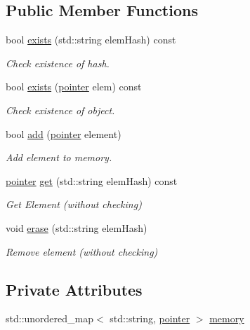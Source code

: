 \subsection*{Public Member Functions}
\begin{DoxyCompactItemize}
\item 
bool \mbox{\hyperlink{classHashMemory_ac9bd6270bbfa924ce5f27fada28afe9f}{exists}} (std\+::string elem\+Hash) const
\begin{DoxyCompactList}\small\item\em Check existence of hash. \end{DoxyCompactList}\item 
bool \mbox{\hyperlink{classHashMemory_aca03e1a9ea9ce94e34871a004cc6f7e4}{exists}} (\mbox{\hyperlink{classHashMemory_ab2c7ace63d7bbcf75d523c445a3a0dbb}{pointer}} elem) const
\begin{DoxyCompactList}\small\item\em Check existence of object. \end{DoxyCompactList}\item 
bool \mbox{\hyperlink{classHashMemory_aa1f2e179dc50cee47891064bbb82f2c9}{add}} (\mbox{\hyperlink{classHashMemory_ab2c7ace63d7bbcf75d523c445a3a0dbb}{pointer}} element)
\begin{DoxyCompactList}\small\item\em Add element to memory. \end{DoxyCompactList}\item 
\mbox{\hyperlink{classHashMemory_ab2c7ace63d7bbcf75d523c445a3a0dbb}{pointer}} \mbox{\hyperlink{classHashMemory_a51cf6dae3ddcf94f7bf13769f6677afd}{get}} (std\+::string elem\+Hash) const
\begin{DoxyCompactList}\small\item\em Get Element (without checking) \end{DoxyCompactList}\item 
void \mbox{\hyperlink{classHashMemory_a96bcc6b0bf9ae5999ca29bb61a3eff0c}{erase}} (std\+::string elem\+Hash)
\begin{DoxyCompactList}\small\item\em Remove element (without checking) \end{DoxyCompactList}\end{DoxyCompactItemize}
\subsection*{Private Attributes}
\begin{DoxyCompactItemize}
\item 
std\+::unordered\+\_\+map$<$ std\+::string, \mbox{\hyperlink{classHashMemory_ab2c7ace63d7bbcf75d523c445a3a0dbb}{pointer}} $>$ \mbox{\hyperlink{classHashMemory_a816a44aa2d5eb7f29284856f3f27ec5f}{memory}}
\end{DoxyCompactItemize}


